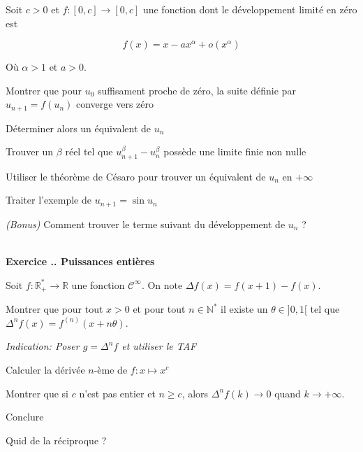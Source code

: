 \documentclass{article}
\newcommand{\mb}[1]{\mathbb{#1}}
\newcounter{exo}
\newcommand{\exercice}[1][\null]{\textbf{\\ Exercice \thesection.\theexo. #1} \addtocounter{exo}{1}}
\newcommand{\indication}[1]{\begin{flushright}\textit{Indication: #1}\end{flushright}}
\begin{document}
Soit $c > 0$ et $f : [0,c] \to [0,c]$ une fonction 
dont le développement limité en zéro est 

\begin{equation*}
    f(x) = x - a x^\alpha + o (x^\alpha)
\end{equation*}

Où $\alpha > 1$ et $a > 0$.
\begin{compactenum}[(i)]
\item Montrer que pour $u_0$ suffisament proche de zéro,
    la suite définie par $u_{n+1} = f(u_n)$ converge 
    vers zéro

\item Déterminer alors un équivalent de $u_n$
\item Trouver un $\beta$ réel tel que 
    $u_{n+1}^\beta - u_n^\beta$ possède une 
    limite finie non nulle

\item Utiliser le théorème de Césaro pour trouver 
    un équivalent de $u_n$ en $+\infty$

\item Traiter l'exemple de $u_{n+1} = \sin u_n$
\item \emph{(Bonus)} Comment trouver le terme suivant 
    du développement de $u_n$ ?
\end{compactenum}

\exercice[Puissances entières]

Soit $f : \mb{R}_+^* \to \mb{R}$ une fonction 
$\mathcal{C}^\infty$. On note $\Delta f (x) = f(x+1) - f(x)$.

\begin{compactenum}[(i)]
\item Montrer que pour tout $x > 0$ et pour tout $n \in \mb{N}^*$
    il existe un $\theta \in ]0,1[$ tel que $\Delta^n f(x) = f^{(n)} (x +
    n\theta)$.

    \indication{Poser $g = \Delta^n f$ et utiliser le TAF}

\item Calculer la dérivée $n$-ème de $f : x \mapsto x^c$
\item Montrer que si $c$ n'est pas entier et $n \geq c$, alors $\Delta^n f(k) \to 0$
    quand $k \to +\infty$.
\item Conclure 
\item Quid de la réciproque ?

\end{compactenum}
\end{document}
